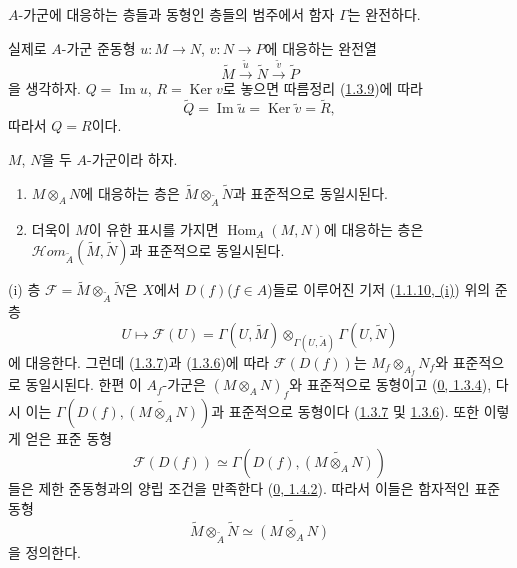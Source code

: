 \begin{corollary}[1.3.11]
\label{I.1.3.11-ko}
$A$-가군에 대응하는 층들과 동형인 층들의 범주에서 함자 $\Gamma$는
완전하다.
\end{corollary}

실제로 $A$-가군 준동형 $u:M\to N$, $v:N\to P$에 대응하는 완전열
\[
  \widetilde{M}\xrightarrow{\widetilde{u}}\widetilde{N}
  \xrightarrow{\widetilde{v}}\widetilde{P}
\]
을 생각하자. $Q=\operatorname{Im}u$, $R=\operatorname{Ker}v$로
놓으면 따름정리 (\hyperref[I.1.3.9-ko]{1.3.9})에 따라
\[
  \widetilde{Q}=\operatorname{Im}\widetilde{u}
  =\operatorname{Ker}\widetilde{v}=\widetilde{R},
\]
따라서 $Q=R$이다.

\begin{corollary}[1.3.12]
\label{I.1.3.12-ko}
$M$, $N$을 두 $A$-가군이라 하자.
\begin{enumerate}
  \item[\rm(i)] $M\otimes_A N$에 대응하는 층은
  $\widetilde{M}\otimes_{\widetilde{A}}\widetilde{N}$과 표준적으로
  동일시된다.
  \item[\rm(ii)] 더욱이 $M$이 유한 표시를 가지면
  $\operatorname{Hom}_A(M,N)$에 대응하는 층은
  $\mathscr{H}\!om_{\widetilde{A}}(\widetilde{M},\widetilde{N})$과
  표준적으로 동일시된다.
\end{enumerate}
\end{corollary}

(i) 층
$\mathscr{F}=\widetilde{M}\otimes_{\widetilde{A}}\widetilde{N}$은
$X$에서 $D(f)$($f\in A$)들로 이루어진 기저
(\hyperref[I.1.1.10-ko]{1.1.10, (i)}) 위의 준층
\[
  U\longmapsto\mathscr{F}(U)=\Gamma(U,\widetilde{M})
  \otimes_{\Gamma(U,\widetilde{A})}\Gamma(U,\widetilde{N})
\]
에 대응한다. 그런데 (\hyperref[I.1.3.7-ko]{1.3.7})과
(\hyperref[I.1.3.6-ko]{1.3.6})에 따라 $\mathscr{F}(D(f))$는
$M_f\otimes_{A_f}N_f$와 표준적으로 동일시된다. 한편 이
$A_f$-가군은 $(M\otimes_A N)_f$와 표준적으로 동형이고
(\hyperref[0.1.3.4-ko]{0, 1.3.4}), 다시 이는
$\Gamma(D(f),\widetilde{(M\otimes_A N)})$과 표준적으로 동형이다
(\hyperref[I.1.3.7-ko]{1.3.7} 및
\hyperref[I.1.3.6-ko]{1.3.6}). 또한 이렇게 얻은 표준 동형
\[
  \mathscr{F}(D(f))\simeq
  \Gamma(D(f),\widetilde{(M\otimes_A N)})
\]
들은 제한 준동형과의 양립 조건을 만족한다
(\hyperref[0.1.4.2-ko]{0, 1.4.2}). 따라서 이들은 함자적인 표준 동형
\[
  \widetilde{M}\otimes_{\widetilde{A}}\widetilde{N}
  \simeq\widetilde{(M\otimes_A N)}
\]
을 정의한다.

